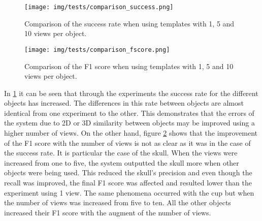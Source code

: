	\begin{figure}[H]
		\begin{center}
	    \texttt{[image: img/tests/comparison\_success.png]}
		\caption[Comparison of the success rate]{Comparison of the success rate when using templates with 1, 5 and 10 views per object.}
		\label{comparison_success}
		\end{center}
	\end{figure}

	\begin{figure}[H]
		\begin{center}
	    \texttt{[image: img/tests/comparison\_fscore.png]}
		\caption[Comparison of the F1 score]{Comparison of the F1 score when using templates with 1, 5 and 10 views per object.}
		\label{comparison_fscore}
		\end{center}
	\end{figure}


		In \ref{comparison_success} it can be seen that through the experiments the success rate for the different objects has increased. 
	The differences in this rate between objects are almost identical from one experiment to the other. 
	This demonstrates that the errors of the system due to 2D or 3D similarity between objects may be improved using a higher number of views. 
	On the other hand, figure \ref{comparison_fscore} shows that the improvement of the F1 score with the number of views is not as clear as it was in the case of the success rate. 
	It is particular the case of the skull. 
	When the views were increased from one to five, the system outputted the skull more when other objects were being used. 
	This reduced the skull's precision and even though the recall was improved, the final F1 score was affected and resulted lower than the experiment using 1 view.  
	The same phenomena occurred with the cup but when the number of views was increased from five to ten. 
	All the other objects increased their F1 score with the augment of the number of views. 
